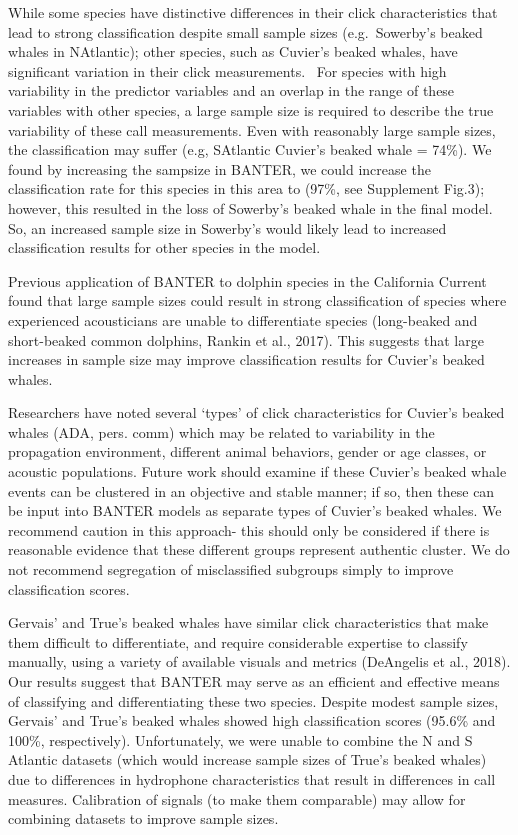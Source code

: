 \documentclass[
  letterpaper,
  DIV=11,
  numbers=noendperiod]{scrartcl}
\begin{document}
While some species have distinctive differences in their click
characteristics that lead to strong classification despite small sample
sizes (e.g.~Sowerby's beaked whales in NAtlantic); other species, such
as Cuvier's beaked whales, have significant variation in their click
measurements. ~For species with high variability in the predictor
variables and an overlap in the range of these variables with other
species, a large sample size is required to describe the true
variability of these call measurements. Even with reasonably large
sample sizes, the classification may suffer (e.g, SAtlantic Cuvier's
beaked whale = 74\%). We found by increasing the sampsize in BANTER, we
could increase the classification rate for this species in this area to
(97\%, see Supplement Fig.3); however, this resulted in the loss of
Sowerby's beaked whale in the final model. So, an increased sample size
in Sowerby's would likely lead to increased classification results for
other species in the model.

Previous application of BANTER to dolphin species in the California
Current found that large sample sizes could result in strong
classification of species where experienced acousticians are unable to
differentiate species (long-beaked and short-beaked common dolphins,
Rankin et al., 2017). This suggests that large increases in sample size
may improve classification results for Cuvier's beaked whales.

Researchers have noted several `types' of click characteristics for
Cuvier's beaked whales (ADA, pers. comm) which may be related to
variability in the propagation environment, different animal behaviors,
gender or age classes, or acoustic populations. Future work should
examine if these Cuvier's beaked whale events can be clustered in an
objective and stable manner; if so, then these can be input into BANTER
models as separate types of Cuvier's beaked whales. We recommend caution
in this approach- this should only be considered if there is reasonable
evidence that these different groups represent authentic cluster. We do
not recommend segregation of misclassified subgroups simply to improve
classification scores.

Gervais' and True's beaked whales have similar click characteristics
that make them difficult to differentiate, and require considerable
expertise to classify manually, using a variety of available visuals and
metrics (DeAngelis et al., 2018). Our results suggest that BANTER may
serve as an efficient and effective means of classifying and
differentiating these two species. Despite modest sample sizes, Gervais'
and True's beaked whales showed high classification scores (95.6\% and
100\%, respectively). Unfortunately, we were unable to combine the N and
S Atlantic datasets (which would increase sample sizes of True's beaked
whales) due to differences in hydrophone characteristics that result in
differences in call measures. Calibration of signals (to make them
comparable) may allow for combining datasets to improve sample sizes.
\end{document}
